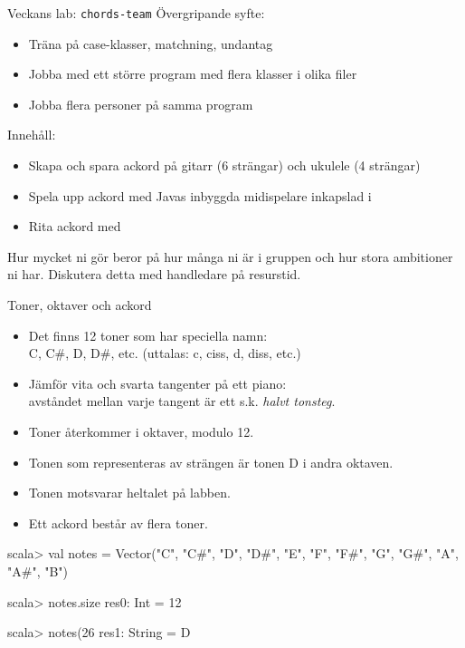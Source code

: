\begin{Slide}{Veckans lab: \texttt{chords-team}}\SlideFontSmall
Övergripande syfte:
\begin{itemize}
\item Träna på case-klasser, matchning, undantag
\item Jobba med ett större program med flera klasser i olika filer
\item Jobba flera personer på samma program
\end{itemize}
Innehåll:
\begin{itemize}
\item Skapa och spara ackord på gitarr (6 strängar) och ukulele (4 strängar) 
\item Spela upp ackord med Javas inbyggda midispelare inkapslad i 
\item Rita ackord med  
\end{itemize}
Hur mycket ni gör beror på hur många ni är i gruppen och hur stora ambitioner ni har. Diskutera detta med handledare på resurstid.
\end{Slide}

\begin{Slide}{Toner, oktaver och ackord}\SlideFontSmall
\begin{itemize}
\item Det finns 12 toner som har speciella namn: \\ C, C\#, D, D\#, etc. (uttalas: c, ciss, d, diss, etc.)
\item Jämför vita och svarta tangenter på ett piano: \\ avståndet mellan varje tangent är ett s.k. \emph{halvt tonsteg}. 
\item Toner återkommer i oktaver, modulo 12.
\item Tonen som representeras av strängen  är tonen D i andra oktaven.
\item Tonen  motsvarar heltalet  på labben.
\item Ett ackord består av flera toner.
\end{itemize}
\begin{REPL}[basicstyle=\color{white}\ttfamily\SlideFontSize{6}{7}\selectfont]
scala> val notes = Vector("C", "C#", "D", "D#", "E", "F", "F#", "G", "G#", "A", "A#", "B")

scala> notes.size
res0: Int = 12

scala> notes(26 %
res1: String = D

\end{REPL}
\end{Slide}

